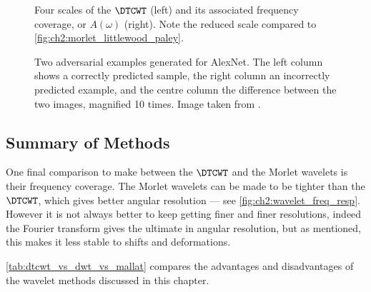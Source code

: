   \begin{figure}
    \subfloat{\makebox[0.6\textwidth][c]{%
    }}
    \subfloat{\makebox[0.4\textwidth][c]{%
    }}
    \caption[$\DTCWT$ basis functions and their frequency coverage]
    {Four scales of the $\DTCWT$ (left) and its associated frequency
    coverage, or $A(\omega)$ (right). Note the reduced scale compared to \autoref{fig:ch2:morlet_littlewood_paley}.}
    \label{fig:ch2:dtcwt_lwoodpaley}
  \end{figure}

  \begin{figure}
    \centering
    \caption[Two adversarial examples generated for AlexNet]
    {Two adversarial examples generated for AlexNet. The left column
    shows a correctly predicted sample, the right column an incorrectly
    predicted example, and the centre column the difference between the two
    images, magnified 10 times. Image taken from
    \citep{szegedy_intriguing_2013}.}
    \label{fig:ch2:difference}
  \end{figure}
\subsection{Summary of Methods}
  One final comparison to make between the $\DTCWT$ and the Morlet wavelets is
  their frequency coverage. The Morlet wavelets can be made to be tighter than
  the $\DTCWT$, which gives better angular resolution --- see
  \autoref{fig:ch2:wavelet_freq_resp}. However it is not always
  better to keep getting finer and finer resolutions, indeed the Fourier
  transform gives the ultimate in angular resolution, but as mentioned, this
  makes it less stable to shifts and deformations. 

  \autoref{tab:dtcwt_vs_dwt_vs_mallat} compares the advantages and
  disadvantages of the wavelet methods discussed in this chapter.

